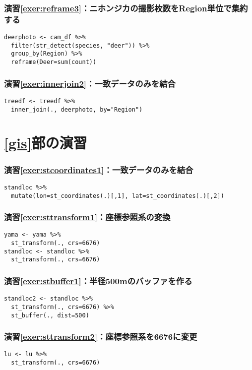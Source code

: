     \subsubsection*{演習\ref{exer:reframe3}：ニホンジカの撮影枚数をRegion単位で集約する}
\begin{verbatim}
deerphoto <- cam_df %>%
  filter(str_detect(species, "deer")) %>%
  group_by(Region) %>%
  reframe(Deer=sum(count))
\end{verbatim}

    \subsubsection*{演習\ref{exer:innerjoin2}：一致データのみを結合}
\begin{verbatim}
treedf <- treedf %>%
  inner_join(., deerphoto, by="Region")
\end{verbatim}

\section*{\ref{gis}部の演習}
    \subsubsection*{演習\ref{exer:stcoordinates1}：一致データのみを結合}
\begin{verbatim}
standloc %>%
  mutate(lon=st_coordinates(.)[,1], lat=st_coordinates(.)[,2])
\end{verbatim}

    \subsubsection*{演習\ref{exer:sttransform1}：座標参照系の変換}
\begin{verbatim}
yama <- yama %>%
  st_transform(., crs=6676)
standloc <- standloc %>%
  st_transform(., crs=6676)
\end{verbatim}

    \subsubsection*{演習\ref{exer:stbuffer1}：半径500mのバッファを作る}
\begin{verbatim}
standloc2 <- standloc %>%
  st_transform(., crs=6676) %>%
  st_buffer(., dist=500)
\end{verbatim}

    \subsubsection*{演習\ref{exer:sttransform2}：座標参照系を6676に変更}
\begin{verbatim}
lu <- lu %>%
  st_transform(., crs=6676)
\end{verbatim}

